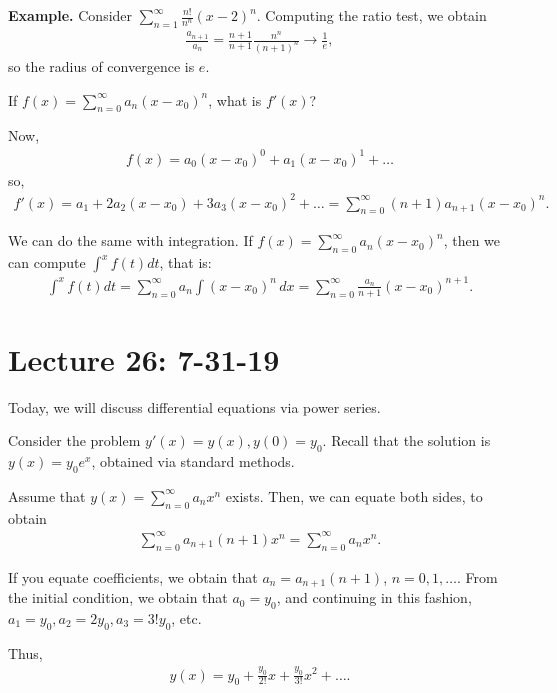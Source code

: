 \documentclass{article}
\begin{document}
{\bf Example.} Consider $\sum_{n=1}^{\infty} \frac{n!}{n^n} (x-2)^n$.  Computing the ratio test, we obtain
\begin{align*}
  \frac{a_{n+1}}{a_n} = \frac{n+1}{n+1} \frac{n^n}{(n+1)^n} \to \frac{1}{e},
\end{align*}
so the radius of convergence is $e$.

If $f(x) = \sum_{n=0}^{\infty} a_n (x - x_0)^n$, what is $f'(x)$?

Now,
\begin{align*}
  f(x) = a_0 (x - x_0)^0 + a_1 (x - x_0)^1 + \dots 
\end{align*}
so,
\begin{align*}
  f'(x) = a_1 +  2 a_2 (x - x_0) + 3 a_3 (x - x_0)^2 + \dots = \sum_{n=0}^{\infty} (n+1) a_{n+1} (x - x_0)^{n}.
\end{align*}

We can do the same with integration.  If $f(x) = \sum_{n=0}^{\infty} a_n (x - x_0)^n$, then we can compute $\int^x f(t) dt$, that is:
\begin{align*}
  \int^x f(t) dt = \sum_{n=0}^{\infty} a_n \int (x - x_0)^n \, dx = \sum_{n=0}^{\infty} \frac{a_n}{n+1} (x - x_0)^{n+1}.
\end{align*}


\section{Lecture 26: 7-31-19}

Today, we will discuss differential equations via power series.

Consider the problem $y'(x) = y(x), y(0) = y_0$.  Recall that the solution is $y(x) = y_0 e^x$, obtained via standard methods.

Assume that $y(x) = \sum_{n=0}^{\infty} a_n x^n$ exists.  Then, we can equate both sides, to obtain
\begin{align*}
  \sum_{n=0}^{\infty} a_{n+1} (n+1) x^n = \sum_{n=0}^{\infty} a_n x^n.
\end{align*}

If you equate coefficients, we obtain that $a_n = a_{n+1}(n+1)$, $n = 0, 1, \dots$.  From the initial condition, we obtain that $a_0 = y_0$, and continuing in this fashion, $a_1 = y_0, a_2 = 2 y_0, a_3 = 3! y_0$, etc.

Thus,
\begin{align*}
  y(x) = y_0 + \frac{y_0}{2!} x + \frac{y_0}{3!} x^2 + \dots.
\end{align*}
\end{document}
